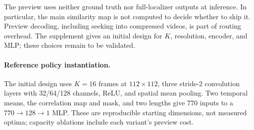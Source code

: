 The preview uses neither ground truth nor full-localizer outputs at inference. In particular,
the main similarity map is not computed to decide whether to skip it. Preview decoding,
including seeking into compressed videos, is part of routing overhead. The supplement gives
an initial design for $K$, resolution, encoder, and MLP; these choices remain to be validated.

\paragraph{Reference policy instantiation.}
The initial design uses $K=16$ frames at $112\times112$, three stride-2 convolution
layers with 32/64/128 channels, ReLU, and spatial mean pooling. Two temporal means,
the correlation map and mask, and two lengths give 770 inputs to a $770\to128\to1$ MLP.
These are reproducible starting dimensions, not measured optima; capacity ablations
include each variant's preview cost.

